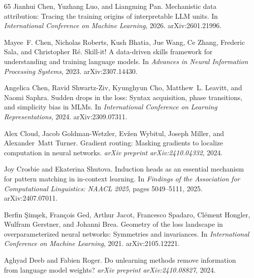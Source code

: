 \begin{thebibliography}{65}
Jianhui Chen, Yuzhang Luo, and Liangming Pan.
\newblock Mechanistic data attribution: Tracing the training origins of interpretable LLM units.
\newblock In \emph{International Conference on Machine Learning}, 2026.
\newblock arXiv:2601.21996.

Mayee~F. Chen, Nicholas Roberts, Kush Bhatia, Jue Wang, Ce Zhang, Frederic Sala, and Christopher R{\'e}.
\newblock Skill-it! A data-driven skills framework for understanding and training language models.
\newblock In \emph{Advances in Neural Information Processing Systems}, 2023.
\newblock arXiv:2307.14430.

Angelica Chen, Ravid Shwartz-Ziv, Kyunghyun Cho, Matthew~L. Leavitt, and Naomi Saphra.
\newblock Sudden drops in the loss: Syntax acquisition, phase transitions, and simplicity bias in MLMs.
\newblock In \emph{International Conference on Learning Representations}, 2024.
\newblock arXiv:2309.07311.

Alex Cloud, Jacob Goldman-Wetzler, Ev{\v{z}}en Wybitul, Joseph Miller, and Alexander~Matt Turner.
\newblock Gradient routing: Masking gradients to localize computation in neural networks.
\newblock \emph{arXiv preprint arXiv:2410.04332}, 2024.

Joy Crosbie and Ekaterina Shutova.
\newblock Induction heads as an essential mechanism for pattern matching in in-context learning.
\newblock In \emph{Findings of the Association for Computational Linguistics: NAACL 2025}, pages 5049--5111, 2025.
\newblock arXiv:2407.07011.

Berfin {\c{S}}im{\c{s}}ek, Fran{\c{c}}ois Ged, Arthur Jacot, Francesco Spadaro, Cl{\'e}ment Hongler, Wulfram Gerstner, and Johanni Brea.
\newblock Geometry of the loss landscape in overparameterized neural networks: Symmetries and invariances.
\newblock In \emph{International Conference on Machine Learning}, 2021.
\newblock arXiv:2105.12221.

Aghyad Deeb and Fabien Roger.
\newblock Do unlearning methods remove information from language model weights?
\newblock \emph{arXiv preprint arXiv:2410.08827}, 2024.


\end{thebibliography}
